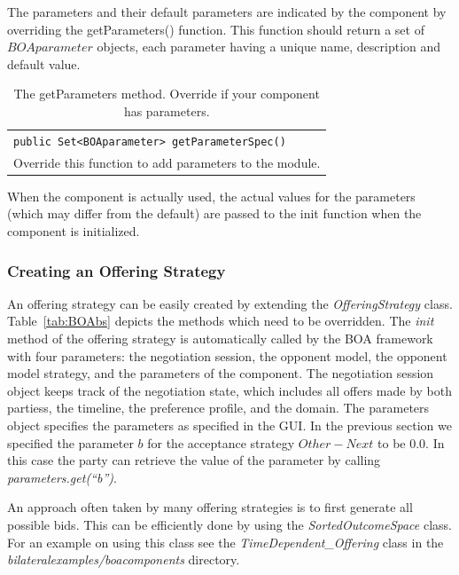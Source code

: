 \documentclass[]{article}
\begin{document}
The parameters and their default parameters are indicated by the component by overriding the getParameters() function. This function should return a set of $BOAparameter$ objects, each parameter having a unique name, description and default value.


\begin{table}[h]
\begin{tabular}{m{}}
\hline
\texttt{public Set<BOAparameter> getParameterSpec() }\\
 Override this function to add parameters to the module.\\
\hline
\end{tabular}
\caption{The getParameters method. Override if your component has parameters.}
\label{tab:parameters}
\end{table}


When the component is actually used, the actual values for the parameters (which may differ from the default) are passed to the init function when the component is initialized.

\subsubsection{Creating an Offering Strategy}
An offering strategy can be easily created by extending the \textit{OfferingStrategy} class. Table~\ref{tab:BOAbs} depicts the methods which need to be overridden. The \textit{init} method of the offering strategy is automatically called by the BOA framework with four parameters: the negotiation session, the opponent model, the opponent model strategy, and the parameters of the component. The negotiation session object keeps track of the negotiation state, which includes all offers made by both partiess, the timeline, the preference profile, and the domain. The parameters object specifies the parameters as specified in the GUI. In the previous section we specified the parameter $b$ for the acceptance strategy $Other - Next$ to be 0.0. In this case the party can retrieve the value of the parameter by calling \textit{parameters.get(``b'')}.

An approach often taken by many offering strategies is to first generate all possible bids. This can be efficiently done by using the \textit{SortedOutcomeSpace} class. For an example on using this class see the \textit{TimeDependent\_Offering} class in the \textit{bilateralexamples/boacomponents} directory.
\end{document}
